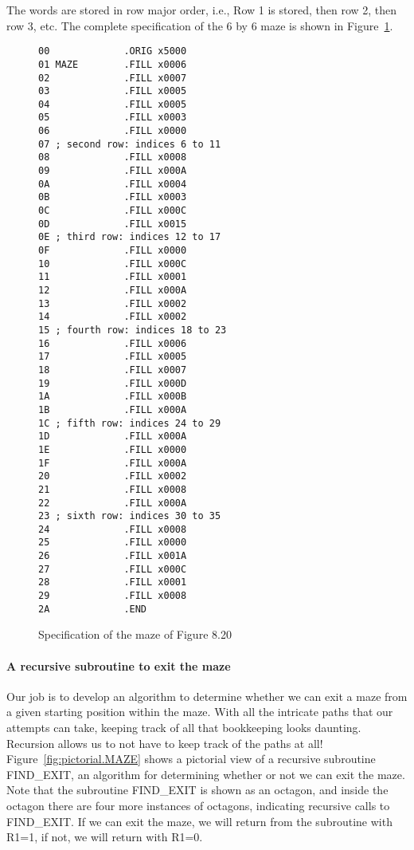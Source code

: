 \documentclass{patt}
\begin{document}
\noindent
The words are stored in row major order, i.e., Row 1 is stored, then row 2, 
then row 3, etc.  The complete specification of the 6 by 6 maze is shown
in Figure~\ref{fig:coded-maze}. 

\begin{figure}[h!]
\begin{minipage}{36pc}
\begin{Verbatim}[fontsize=\fontsize{9}{11}\selectfont]
00             .ORIG x5000
01 MAZE        .FILL x0006
02             .FILL x0007
03             .FILL x0005
04             .FILL x0005
05             .FILL x0003
06             .FILL x0000
07 ; second row: indices 6 to 11
08             .FILL x0008
09             .FILL x000A
0A             .FILL x0004
0B             .FILL x0003
0C             .FILL x000C
0D             .FILL x0015
0E ; third row: indices 12 to 17
0F             .FILL x0000
10             .FILL x000C
11             .FILL x0001
12             .FILL x000A
13             .FILL x0002
14             .FILL x0002
15 ; fourth row: indices 18 to 23
16             .FILL x0006
17             .FILL x0005
18             .FILL x0007
19             .FILL x000D
1A             .FILL x000B
1B             .FILL x000A
1C ; fifth row: indices 24 to 29
1D             .FILL x000A
1E             .FILL x0000
1F             .FILL x000A
20             .FILL x0002
21             .FILL x0008
22             .FILL x000A
23 ; sixth row: indices 30 to 35
24             .FILL x0008
25             .FILL x0000
26             .FILL x001A
27             .FILL x000C
28             .FILL x0001
29             .FILL x0008
2A             .END
\end{Verbatim}
\caption{Specification of the maze of Figure 8.20}
\label{fig:coded-maze}
\end{minipage}
\end{figure}

\FloatBarrier
\paragraph{A recursive subroutine to exit the maze}

Our job is to develop an algorithm to determine whether we can exit a maze from 
a given starting position within the maze.  With all the intricate paths that 
our attempts can take, keeping track of all that bookkeeping looks daunting.
Recursion allows us to not have to keep track of the paths at all!  
Figure~\ref{fig:pictorial.MAZE} shows a pictorial view of a recursive 
subroutine FIND\_EXIT, an algorithm for determining whether or not we can 
exit the maze.  Note that the subroutine FIND\_EXIT is shown as an octagon, 
and inside the octagon there are four more instances of octagons, indicating
recursive calls to FIND\_EXIT.  If we can exit the maze, we will return 
from the subroutine with R1=1, if not, we will return with R1=0.
\end{document}
